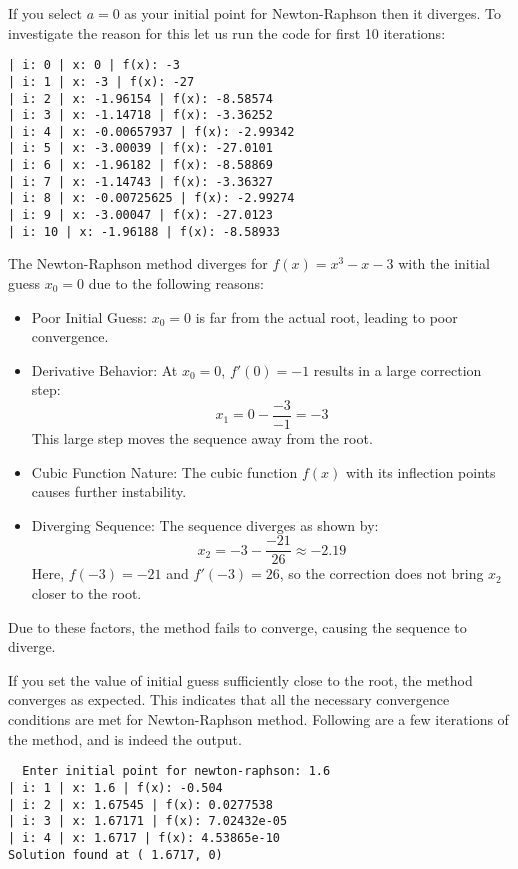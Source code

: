 \documentclass[a4paper]{article}
\begin{document}
\begin{answer}[Question 2.1 - At a = 0]{}
	If you select $a=0$ as your initial point for Newton-Raphson then it diverges. To investigate the reason for this
	let us run the code for first 10 iterations:
	\begin{verbatim}
| i: 0 | x: 0 | f(x): -3
| i: 1 | x: -3 | f(x): -27
| i: 2 | x: -1.96154 | f(x): -8.58574
| i: 3 | x: -1.14718 | f(x): -3.36252
| i: 4 | x: -0.00657937 | f(x): -2.99342
| i: 5 | x: -3.00039 | f(x): -27.0101
| i: 6 | x: -1.96182 | f(x): -8.58869
| i: 7 | x: -1.14743 | f(x): -3.36327
| i: 8 | x: -0.00725625 | f(x): -2.99274
| i: 9 | x: -3.00047 | f(x): -27.0123
| i: 10 | x: -1.96188 | f(x): -8.58933
\end{verbatim}
	The Newton-Raphson method diverges for \( f(x) = x^3 - x - 3 \) with the initial guess \( x_0 = 0 \) due to the
	following reasons:
	\begin{itemize}
		\item Poor Initial Guess: \( x_0 = 0 \) is far from the actual root, leading to poor convergence.
		\item Derivative Behavior: At \( x_0 = 0 \), \( f'(0) = -1 \) results in a large correction step:
		      \[
			      x_1 = 0 - \frac{-3}{-1} = -3
		      \]
		      This large step moves the sequence away from the root.
		\item Cubic Function Nature: The cubic function \( f(x) \) with its inflection points causes further instability.
		\item Diverging Sequence: The sequence diverges as shown by:
		      \[
			      x_2 = -3 - \frac{-21}{26} \approx -2.19
		      \]
		      Here, \( f(-3) = -21 \) and \( f'(-3) = 26 \), so the correction does not bring \( x_2 \) closer to the root.
	\end{itemize}
	Due to these factors, the method fails to converge, causing the sequence to diverge.
\end{answer}

\begin{answer}[Question 2.1 - At a = 1.6717]{}
	If you set the value of initial guess sufficiently close to the root, the method converges as expected.
	This indicates that all the necessary convergence conditions are met for Newton-Raphson method. Following are a
	few iterations of the method, and is indeed the output.
	\begin{verbatim}
  Enter initial point for newton-raphson: 1.6
| i: 1 | x: 1.6 | f(x): -0.504
| i: 2 | x: 1.67545 | f(x): 0.0277538
| i: 3 | x: 1.67171 | f(x): 7.02432e-05
| i: 4 | x: 1.6717 | f(x): 4.53865e-10
Solution found at ( 1.6717, 0)
\end{verbatim}
\end{answer}
\end{document}
